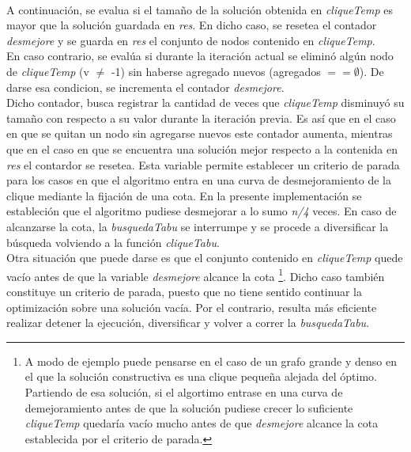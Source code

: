 \paragraph{}
A continuación, se evalua si el tamaño de la solución obtenida en \textit{cliqueTemp} es mayor que la solución guardada en \textit{res}. En dicho caso, se resetea el contador \textit{desmejore} y se guarda en \textit{res} el conjunto de nodos contenido en \textit{cliqueTemp}. \\
En caso contrario, se evalúa si durante la iteración actual se eliminó algún nodo de \textit{cliqueTemp} (v $\neq$ -1) sin haberse agregado nuevos (agregados $== \emptyset$). De darse esa condicion, se incrementa el contador \textit{desmejore}. \\
Dicho contador, busca registrar la cantidad de veces que \textit{cliqueTemp} disminuyó su tamaño con respecto a su valor durante la iteración previa. Es así que en el caso en que se quitan un nodo sin agregarse nuevos este contador aumenta, mientras que en el caso en que se encuentra una solución mejor respecto a la contenida en \textit{res} el contardor se resetea. Esta variable permite establecer un criterio de parada para los casos en que el algoritmo entra en una curva de desmejoramiento de la clique mediante la fijación de una cota. En la presente implementación se estableción que el algoritmo pudiese desmejorar a lo sumo \textit{n/4} veces. En caso de alcanzarse la cota, la \textit{busquedaTabu} se interrumpe y se procede a diversificar la búsqueda volviendo a la función \textit{cliqueTabu}. \\
Otra situación que puede darse es que el conjunto contenido en \textit{cliqueTemp} quede vacío antes de que la variable \textit{desmejore} alcance la cota \footnote{A modo de ejemplo puede pensarse en el caso de un grafo grande y denso en el que la solución constructiva es una clique pequeña alejada del óptimo. Partiendo de esa solución, si el algortimo entrase en una curva de demejoramiento antes de que la solución pudiese crecer lo suficiente \textit{cliqueTemp} quedaría vacío mucho antes de que \textit{desmejore} alcance la cota establecida por el criterio de parada.}. Dicho caso también constituye un criterio de parada, puesto que no tiene sentido continuar la optimización sobre una solución vacía. Por el contrario, resulta más eficiente realizar detener la ejecución, diversificar y volver a correr la \textit{busquedaTabu}.

